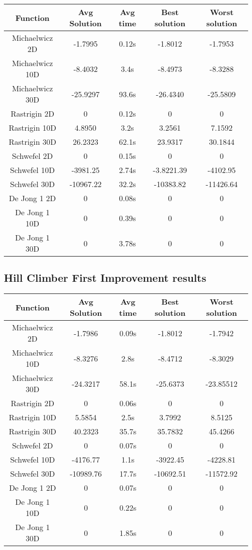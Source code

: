 \documentclass{article}
\begin{document}
\begin{tabular}{|c|c|c|c|c|}
\hline
 Function & Avg Solution & Avg time & Best solution & Worst solution \\ \hline
 Michaelwicz 2D & -1.7995 & 0.12s & -1.8012 & -1.7953 \\ \hline
 Michaelwicz 10D & -8.4032 & 3.4s & -8.4973 & -8.3288 \\ \hline
 Michaelwicz 30D & -25.9297 & 93.6s & -26.4340 & -25.5809 \\ \hline
 Rastrigin 2D & 0 & 0.12s & 0 & 0 \\ \hline
 Rastrigin 10D & 4.8950 & 3.2s & 3.2561 & 7.1592 \\ \hline
 Rastrigin 30D & 26.2323 & 62.1s & 23.9317 & 30.1844 \\ \hline
 Schwefel 2D & 0 & 0.15s & 0 & 0 \\ \hline
 Schwefel 10D & -3981.25 & 2.74s & -3.8221.39 & -4102.95 \\ \hline
 Schwefel 30D & -10967.22 & 32.2s & -10383.82 & -11426.64 \\ \hline
 De Jong 1 2D & 0 & 0.08s & 0 & 0 \\ \hline
 De Jong 1 10D & 0 & 0.39s & 0 & 0 \\ \hline
 De Jong 1 30D & 0 & 3.78s & 0 & 0 \\ \hline
\end{tabular}

\subsection{Hill Climber First Improvement results}

\begin{tabular}{|c|c|c|c|c|}
\hline
 Function & Avg Solution & Avg time & Best solution & Worst solution \\ \hline
 Michaelwicz 2D & -1.7986 & 0.09s & -1.8012 & -1.7942 \\ \hline
 Michaelwicz 10D & -8.3276 & 2.8s & -8.4712 & -8.3029 \\ \hline
 Michaelwicz 30D & -24.3217 & 58.1s & -25.6373 & -23.85512 \\ \hline
 Rastrigin 2D & 0 & 0.06s & 0 & 0 \\ \hline
 Rastrigin 10D & 5.5854 & 2.5s & 3.7992 & 8.5125 \\ \hline
 Rastrigin 30D & 40.2323 & 35.7s & 35.7832 & 45.4266 \\ \hline
 Schwefel 2D & 0 & 0.07s & 0 & 0 \\ \hline
 Schwefel 10D & -4176.77 & 1.1s & -3922.45 & -4228.81 \\ \hline
 Schwefel 30D & -10989.76 & 17.7s & -10692.51 & -11572.92 \\ \hline
 De Jong 1 2D & 0 & 0.07s & 0 & 0 \\ \hline
 De Jong 1 10D & 0 & 0.22s & 0 & 0 \\ \hline
 De Jong 1 30D & 0 & 1.85s & 0 & 0 \\ \hline
\end{tabular}
\end{document}

